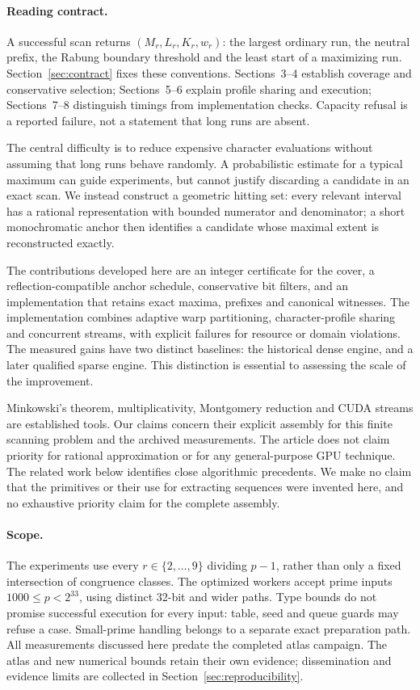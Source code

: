 \documentclass[11pt]{article}
\theoremstyle{definition}\newtheorem{remark}[theorem]{Remark}
\begin{document}
\paragraph{Reading contract.}
A successful scan returns $(M_r,L_r,K_r,w_r)$: the largest ordinary run,
the neutral prefix, the Rabung boundary threshold and the least start of
a maximizing run. Section~\ref{sec:contract} fixes these conventions.
Sections~3--4 establish coverage and conservative selection; Sections~5--6
explain profile sharing and execution; Sections~7--8 distinguish timings
from implementation checks. Capacity refusal is a reported failure, not a
statement that long runs are absent.

The central difficulty is to reduce expensive character evaluations without
assuming that long runs behave randomly. A probabilistic estimate for a
typical maximum can guide experiments, but cannot justify discarding a
candidate in an exact scan. We instead construct a geometric hitting set:
every relevant interval has a rational representation with bounded numerator
and denominator; a short monochromatic anchor then identifies a candidate
whose maximal extent is reconstructed exactly.

The contributions developed here are an integer certificate for the cover,
a reflection-compatible anchor schedule, conservative bit filters, and an
implementation that retains exact maxima, prefixes and canonical witnesses.
The implementation combines adaptive warp partitioning, character-profile
sharing and concurrent streams, with explicit failures for resource or
domain violations. The measured gains have two distinct baselines: the
historical dense engine, and a later qualified sparse engine. This distinction
is essential to assessing the scale of the improvement.

Minkowski's theorem, multiplicativity, Montgomery reduction and CUDA streams
are established tools. Our claims concern their explicit assembly for this
finite scanning problem and the archived measurements. The article does not
claim priority for rational approximation or for any general-purpose GPU
technique. The related work below identifies close algorithmic precedents. We make no
claim that the primitives or their use for extracting sequences were invented
here, and no exhaustive priority claim for the complete assembly.

\paragraph{Scope.}
The experiments use every $r\in\{2,\ldots,9\}$ dividing $p-1$, rather than
only a fixed intersection of congruence classes. The optimized workers accept
prime inputs $1000\le p<2^{33}$, using distinct 32-bit and wider paths. Type
bounds do not promise successful execution for every input: table, seed and
queue guards may refuse a case. Small-prime handling belongs to a separate
exact preparation path. All measurements discussed here predate the completed atlas campaign.
The atlas and new numerical bounds retain their own evidence; dissemination and evidence limits
are collected in Section~\ref{sec:reproducibility}.
\end{document}
